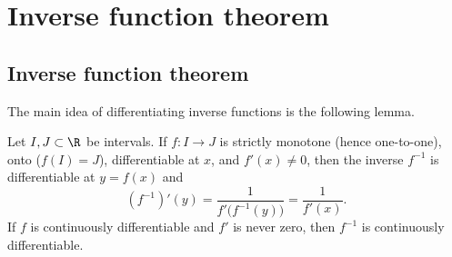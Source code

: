 \documentclass[12pt]{book}
\begin{document}

\sectionnewpage
\section{Inverse function theorem}
\label{sec:ift}


\subsection*{Inverse function theorem}

The main idea of differentiating inverse functions is the following lemma.

\begin{lemma} \label{lemma:ift}
Let $I,J \subset \R$ be intervals.
If $f \colon I \to J$ is strictly monotone (hence one-to-one),
onto ($f(I) = J$),
differentiable at $x$, and $f'(x) \not= 0$,
then the inverse 
$f^{-1}$ is differentiable at $y = f(x)$ and
\begin{equation*}
(f^{-1})'(y) = \frac{1}{f'\bigl( f^{-1}(y) \bigr)} = \frac{1}{f'(x)} .
\end{equation*}
If $f$ is continuously differentiable and $f'$ is never zero, then $f^{-1}$
is continuously differentiable.
\end{lemma}
\end{document}
